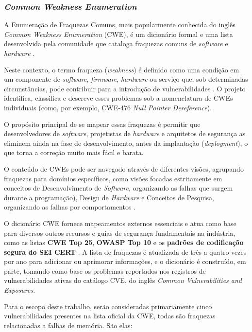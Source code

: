 \documentclass[
    12pt,                %
    openright,           %
    oneside,             %
    a4paper,             %
    english,             %
    brazil               %
]{abntex2}
\begin{document}
\subsubsection{\textit{Common Weakness Enumeration}}
\label{sec:cwes}
\par
A Enumeração de Fraquezas Comuns, mais popularmente conhecida do inglês \textit{Common Weakness Enumeration} (CWE), é um dicionário formal e uma lista desenvolvida pela comunidade que cataloga fraquezas comuns de \textit{software} e \textit{hardware} \cite{mitrecwe}.
\par
Neste contexto, o termo fraqueza (\textit{weakness}) é definido como uma condição em um componente de \textit{software}, \textit{firmware}, \textit{hardware} ou serviço que, sob determinadas circunstâncias, pode contribuir para a introdução de vulnerabilidades \cite{mitrecwe}.
O projeto identifica, classifica e descreve esses problemas sob a nomenclatura de CWEs individuais (como, por exemplo, CWE-476 \textit{Null Pointer Dereference}).
\par
O propósito principal de se mapear essas fraquezas é permitir que desenvolvedores de \textit{software}, projetistas de \textit{hardware} e arquitetos de segurança as eliminem ainda na fase de desenvolvimento, antes da implantação (\textit{deployment}), o que torna a correção muito mais fácil e barata.
\par 
O conteúdo de CWEs pode ser navegado através de diferentes visões, agrupando fraquezas para domínios específicos, como visões focadas estritamente em conceitos de Desenvolvimento de \textit{Software}, organizando as falhas que surgem durante a programação), Design de \textit{Hardware} e Conceitos de Pesquisa, organizando as falhas por comportamentos \cite{mitrecwe}.
\par
O dicionário CWE fornece mapeamentos externos essenciais e atua como base para diversos outros recursos e guias de segurança fundamentais na indústria, como as listas \textbf{CWE Top 25}, \textbf{OWASP Top 10} e os \textbf{padrões de codificação segura do SEI CERT} \cite{mitrecwe, seicertc2016}.
A lista de fraquezas é atualizada de três a quatro vezes por ano para adicionar ou aprimorar informações, e o dicionário é construído, em parte, tomando como base os problemas reportados nos registros de vulnerabilidades ativas do catálogo CVE, do inglês \textit{Common Vulnerabilities and Exposures}.
\par
Para o escopo deste trabalho, serão consideradas primariamente cinco vulnerabilidades presentes na lista oficial da CWE, todas são fraquezas relacionadas a falhas de memória.
São elas:
\end{document}
